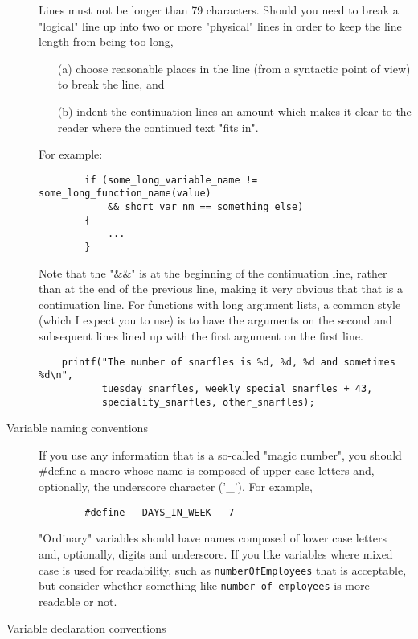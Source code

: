\begin{description}
    Lines must not be longer than 79 characters.
    Should you need to break a "logical" line up into two or more
    "physical" lines in order to keep the line length from being too
    long,
\begin{enumerate}
    \item[(a)] choose reasonable places in the line (from a syntactic point
        of view) to break the line, and
    \item[(b)] indent the continuation lines an amount which makes it clear
        to the reader where the continued text "fits in".
    \end{enumerate}
    For example:
\begin{verbatim}
        if (some_long_variable_name != some_long_function_name(value)
            && short_var_nm == something_else)
        {
            ...
        }
\end{verbatim}
    Note that the "\&\&" is at the beginning of the continuation line,
    rather than at the end of the previous line, making it very
    obvious that that is a continuation line.
\clearpage
    For functions with long argument lists, a common style (which I
    expect you to use) is to have the arguments on the second and
    subsequent lines lined up with the first argument on the first line.
\begin{verbatim}
    printf("The number of snarfles is %d, %d, %d and sometimes %d\n",
           tuesday_snarfles, weekly_special_snarfles + 43,
           speciality_snarfles, other_snarfles);
\end{verbatim}
\item[Variable naming conventions] \hfill

    If you use any information that is a so-called "magic number", you
    should \#define a macro whose name is composed of upper case
    letters and, optionally, the underscore character ('\_'). 
    For example,
\begin{verbatim}
        #define   DAYS_IN_WEEK   7
\end{verbatim}
    "Ordinary" variables should have names composed of lower case
    letters and, optionally, digits and underscore.  If you like
    variables where mixed case is used for readability, such as
      \verb|numberOfEmployees|
    that is acceptable, but consider whether something like
      \verb|number_of_employees|
    is more readable or not.

\item[Variable declaration conventions] \hfill


\end{description}
